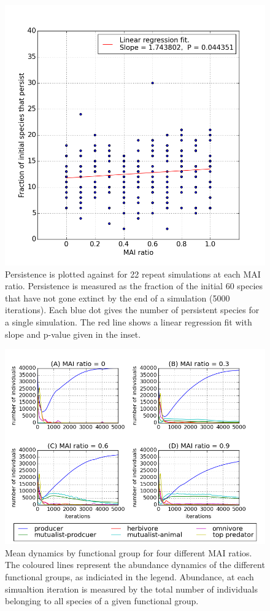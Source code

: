 \begin{figure}
	\centering
	\includegraphics[width=0.6\linewidth]{"figures/mvp1_22reps"}
	\caption{Persistence is plotted against for 22 repeat simulations at each MAI ratio. Persistence is measured as the fraction of the initial 60 species that have not gone extinct by the end of a simulation (5000 iterations). Each blue dot gives the number of persistent species for a single simulation. The red line shows a linear regression fit with slope and p-value given in the inset.}
	\label{fig:mai_vs_persistence}
\end{figure}

\begin{figure}
	\centering
	\includegraphics[width=1.0\linewidth]{"figures/mean_trophic_dynamics"}
	\caption{Mean dynamics by functional group for four different MAI ratios. The coloured lines represent the abundance dynamics of the different functional groups, as indiciated in the legend. Abundance, at each simualtion iteration is measured by the total number of individuals belonging to all species of a given functional group.}
	\label{fig:mvp_mean_dynamics}
\end{figure}

